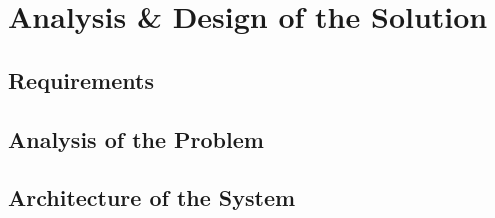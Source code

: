 \chapter{Analysis \& Design of the Solution}

\section{Requirements}

\section{Analysis of the Problem}

\section{Architecture of the System}